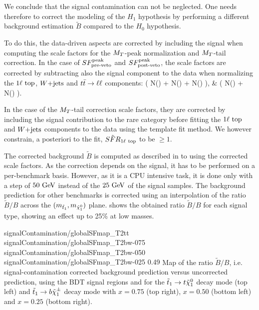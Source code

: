     We conclude that the signal contamination can not be neglected. One needs therefore to
    correct the modeling of the $H_1$ hypothesis by performing a different background
    estimation $\tilde{B}$ compared to the $H_0$ hypothesis.

    To do this, the data-driven aspects are corrected by including the signal when computing the scale factors for the
    $M_T$-peak normalization and $M_T$-tail correction. In the case of $SF_{\text{pre-veto}}^{\text{peak}}$ and $SF_{\text{post-veto}}^{\text{peak}}$, the scale factors
    are corrected by subtracting also the signal component to the data when normalizing the $1\ell~\text{top}$, $\text{$W$+jets}$
    and $t\bar{t} \rightarrow \ell \ell$ components:
    {
        \SFpreTilde
        \left(
                 {N(\oneLeptonTop) + N(\Wjets) + N(\diLeptonTop)}
        \right),
     }
     {
        \SFpostTilde
        & 
        \left(
                 {N(\oneLeptonTop) + N(\Wjets)}
        \right).
    }

    In the case of the $M_T$-tail correction scale factors, they are corrected by including the signal contribution
    to the rare category before fitting the $1\ell~\text{top}$ and $\text{$W$+jets}$ components to the data using the template
    fit method. We however constrain, a posteriori to the fit, $\tilde{SFR}_{1\ell~\text{top}}$ to be $\geq 1$.

    The corrected background $\tilde{B}$ is computed as described in
     to  using the
    corrected scale factors. As the correction depends on the signal, it has to be
    performed on a per-benchmark basis. However, as it is a CPU intensive task, it is done
    only with a step of $50 ~\text{GeV}$ instead of the $25 ~\text{GeV}$ of the signal samples. The
    background prediction for other benchmarks is corrected using an interpolation of the
    ratio $\tilde{B}/B$ across the $(m_{\tilde{t}_1},m_{\tilde{\chi}_1^0})$ plane.
     shows the obtained ratio $\tilde{B}/B$ for each
    signal type, showing an effect up to 25\% at low masses.

                      {signalContamination/globalSFmap_T2tt}
                      {signalContamination/globalSFmap_T2bw-075}
                      {signalContamination/globalSFmap_T2bw-050}
                      {signalContamination/globalSFmap_T2bw-025}
                      {0.49}
                      {Map of the ratio $\tilde{B}/B$, i.e. signal-contamination corrected background prediction versus uncorrected prediction, using the BDT signal regions and for the $\tilde{t}_1 \rightarrow t \tilde{\chi}_1^0$ decay mode (top left) and $\tilde{t}_1 \rightarrow b \tilde{\chi}_1^\pm$ decay mode with $x=0.75$ (top right), $x=0.50$ (bottom left) and $x=0.25$ (bottom right).}

